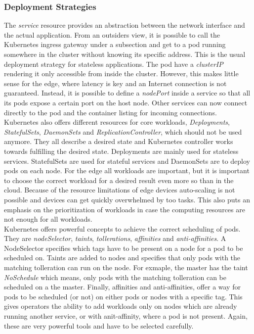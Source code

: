 \subsubsection{Deployment Strategies}

The \textit{service} resource provides an abstraction between the network interface and the actual application. From an outsiders view, it is possible to call the Kubernetes ingress gateway under a subsection and get to a pod running somewhere in the cluster without knowing its specific address. This is the usual deployment strategy for stateless applications. The pod have a \textit{clusterIP} rendering it only accessible from inside the cluster. However, this makes little sense for the edge, where latency is key and an Internet connection is not guaranteed. Instead, it is possible to define a \textit{nodePort} inside a service so that all its pods expose a certain port on the host node. Other services can now connect directly to the pod and the container listing for incoming connections.\\
Kubernetes also offers different resources for core workloads, \textit{Deployments},  \textit{StatefulSets},  \textit{DaemonSets} and  \textit{ReplicationController}, which should not be used anymore\cite{CoreWorkloadKubernetes66:online}. They all describe a desired state and Kubernetes controller works towards fulfilling the desired state. Deployments are mainly used for stateless services. StatefulSets are used for stateful services and DaemonSets are to deploy pods on each node. For the edge all workloads are important, but it is important to choose the correct workload for a desired result even more so than in the cloud. Because of the resource limitations of edge devices auto-scaling is not possible and devices can get quickly overwhelmed by too tasks. This also puts an emphasis on the prioritization of workloads in case the computing resources are not enough for all workloads.\\
Kubernetes offers powerful concepts to achieve the correct scheduling of pods. They are \textit{nodeSelector}, \textit{taints}, \textit{tollerations}, \textit{affinities} and \textit{anti-affinities}. A NodeSelector specifies which tags have to be present on a node for a pod to be scheduled on. Taints are added to nodes and specifies that only pods with the matching tolleration can run on the node. For exmaple, the master has the taint \textit{NoSchedule} which means, only pods with the matching tolleration can be scheduled on a the master. Finally, affinities and anti-affinities, offer a way for pods to be scheduled (or not) on either pods or nodes with a specific tag. This gives operators the ability to add workloads only on nodes which are already running another service, or with anit-affinity, where a pod is not present. Again, these are very powerful tools and have to be selected carefully.\\
